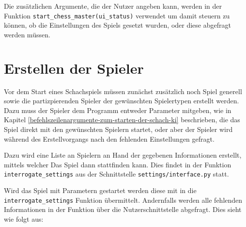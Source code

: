     Die zusätzlichen Argumente, die der Nutzer angeben kann, werden in der
Funktion \texttt{start\_chess\_master(ui\_status)} verwendet um damit
steuern zu können, ob die Einstellungen des Spiels gesetzt wurden, oder
diese abgefragt werden müssen.

    \section{Erstellen der Spieler}\label{erstellen-der-spieler}

Vor dem Start eines Schachspiels müssen zunächst zusätzlich noch Spiel
generell sowie die partizpierenden Spieler der gewünschten Spielertypen
erstellt werden. Dazu muss der Spieler dem Programm entweder Parameter
mitgeben, wie in Kapitel \ref{befehlszeilenargumente-zum-starten-der-schach-ki} beschrieben, die das Spiel direkt mit
den gewünschten Spielern startet, oder aber der Spieler wird während des
Erstellvorgangs nach den fehlenden Einstellungen gefragt.

Dazu wird eine Liste an Spielern an Hand der gegebenen Informationen
erstellt, mittels welcher Das Spiel dann stattfinden kann. Dies findet
in der Funktion \texttt{interrogate\_settings} aus der Schnittstelle
\texttt{settings/interface.py} statt.

Wird das Spiel mit Parametern gestartet werden diese mit in die
\texttt{interrogate\_settings} Funktion übermittelt. Andernfalls werden
alle fehlenden Informationen in der Funktion über die
Nutzerschnittstelle abgefragt. Dies sieht wie folgt aus:


